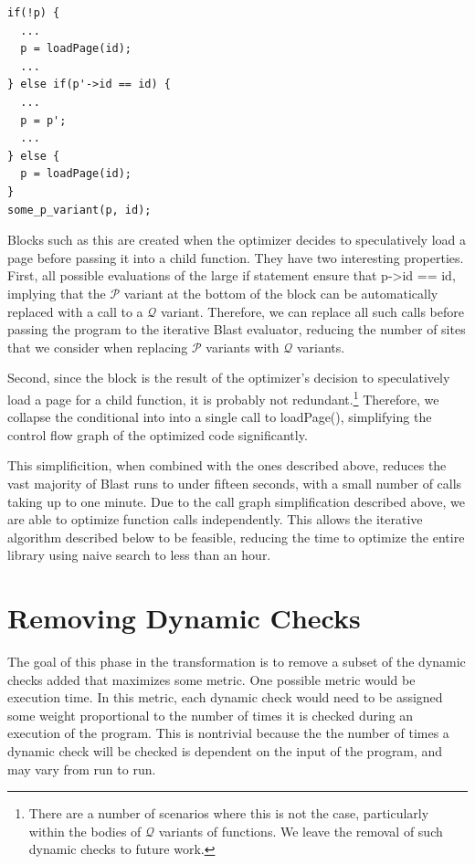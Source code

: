 \documentclass[10pt,letterpaper,twocolumn,english]{article}
\newcommand{\pin}{loadPage()\xspace}
\newcommand{\fP}{{$\mathcal P$}\xspace}
\newcommand{\fQ}{{$\mathcal Q$}\xspace}
\begin{document}
\begin{verbatim}
if(!p) { 
  ...
  p = loadPage(id);
  ...
} else if(p'->id == id) {
  ...
  p = p';
  ...
} else {
  p = loadPage(id);
}
some_p_variant(p, id);
\end{verbatim}

Blocks such as this are created when the optimizer decides to
speculatively load a page before passing it into a child function.
They have two interesting properties.  First, all possible evaluations
of the large if statement ensure that p->id == id, implying that the
\fP variant at the bottom of the block can be automatically replaced
with a call to a \fQ variant.  Therefore, we can replace all such calls
before passing the program to the iterative Blast evaluator, reducing
the number of sites that we consider when replacing \fP variants with
\fQ variants.

Second, since the block is the result of the optimizer's decision to
speculatively load a page for a child function, it is probably not
redundant.\footnote{There are a number of scenarios where this is not
the case, particularly within the bodies of \fQ variants of functions.
We leave the removal of such dynamic checks to future work.}
Therefore, we collapse the conditional into into a single call to
\pin, simplifying the control flow graph of the optimized code
significantly.  

This simplificition, when combined with the ones described above,
reduces the vast majority of Blast runs to under fifteen seconds, with
a small number of calls taking up to one minute.  Due to the call graph
simplification described above, we are able to optimize function calls
independently.  This allows the iterative algorithm described below to
be feasible, reducing the time to optimize the entire library using
naive search to less than an hour.

\section{Removing Dynamic Checks}
\label{delta}
The goal of this phase in the transformation is to remove a subset of
the dynamic checks added that maximizes some metric.  One possible
metric would be execution time.  In this metric, each dynamic check
would need to be assigned some weight proportional to the number of
times it is checked during an execution of the program.  This is
nontrivial because the the number of times a dynamic check will be
checked is dependent on the input of the program, and may vary from run
to run. 
\end{document}
